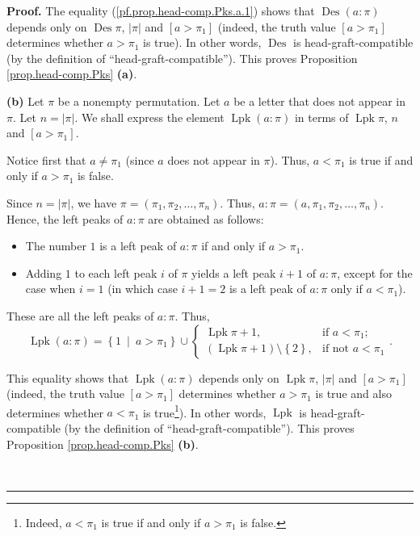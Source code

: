 \documentclass[numbers=enddot,12pt,final,onecolumn,notitlepage]{scrartcl}%
\theoremstyle{definition}
\newenvironment{proof}[1][Proof]{\noindent\textbf{#1.} }{\ \rule{0.5em}{0.5em}}
\begin{document}
\begin{proof}
The equality (\ref{pf.prop.head-comp.Pks.a.1}) shows that $\operatorname*{Des}%
\left(  a:\pi\right)  $ depends only on $\operatorname*{Des}\pi$, $\left\vert
\pi\right\vert $ and $\left[  a>\pi_{1}\right]  $ (indeed, the truth value
$\left[  a>\pi_{1}\right]  $ determines whether $a>\pi_{1}$ is true). In other
words, $\operatorname*{Des}$ is head-graft-compatible (by the definition of
\textquotedblleft head-graft-compatible\textquotedblright). This proves
Proposition \ref{prop.head-comp.Pks} \textbf{(a)}.

\textbf{(b)} Let $\pi$ be a nonempty permutation. Let $a$ be a letter that
does not appear in $\pi$. Let $n=\left\vert \pi\right\vert $. We shall express
the element $\operatorname*{Lpk}\left(  a:\pi\right)  $ in terms of
$\operatorname*{Lpk}\pi$, $n$ and $\left[  a>\pi_{1}\right]  $.

Notice first that $a\neq\pi_{1}$ (since $a$ does not appear in $\pi$). Thus,
$a<\pi_{1}$ is true if and only if $a>\pi_{1}$ is false.

Since $n=\left\vert \pi\right\vert $, we have $\pi=\left(  \pi_{1},\pi
_{2},\ldots,\pi_{n}\right)  $. Thus, $a:\pi=\left(  a,\pi_{1},\pi_{2}%
,\ldots,\pi_{n}\right)  $. Hence, the left peaks of $a:\pi$ are obtained as follows:

\begin{itemize}
\item The number $1$ is a left peak of $a:\pi$ if and only if $a>\pi_{1}$.

\item Adding $1$ to each left peak $i$ of $\pi$ yields a left peak $i+1$ of
$a:\pi$, except for the case when $i=1$ (in which case $i+1=2$ is a left peak
of $a:\pi$ only if $a<\pi_{1}$).
\end{itemize}

These are all the left peaks of $a:\pi$. Thus,%
\begin{equation}
\operatorname*{Lpk}\left(  a:\pi\right)  =\left\{  1\ \mid\ a>\pi_{1}\right\}
\cup%
\begin{cases}
\operatorname*{Lpk}\pi+1, & \text{if }a<\pi_{1};\\
\left(  \operatorname*{Lpk}\pi+1\right)  \setminus\left\{  2\right\}  , &
\text{if not }a<\pi_{1}%
\end{cases}
. \label{pf.prop.head-comp.Pks.b.1}%
\end{equation}


This equality shows that $\operatorname*{Lpk}\left(  a:\pi\right)  $ depends
only on $\operatorname*{Lpk}\pi$, $\left\vert \pi\right\vert $ and $\left[
a>\pi_{1}\right]  $ (indeed, the truth value $\left[  a>\pi_{1}\right]  $
determines whether $a>\pi_{1}$ is true and also determines whether $a<\pi_{1}$
is true\footnote{Indeed, $a<\pi_{1}$ is true if and only if $a>\pi_{1}$ is
false.}). In other words, $\operatorname*{Lpk}$ is head-graft-compatible (by
the definition of \textquotedblleft head-graft-compatible\textquotedblright).
This proves Proposition \ref{prop.head-comp.Pks} \textbf{(b)}.


\end{proof}
\end{document}
